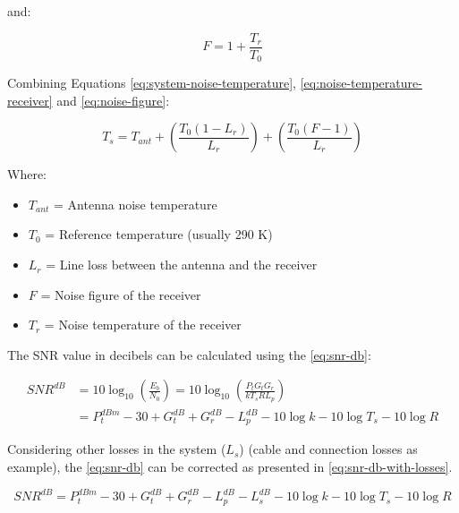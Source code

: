 and:

\begin{equation} \label{eq:noise-figure}
    F = 1 + \frac{T_{r}}{T_{0}}
\end{equation}

Combining Equations \ref{eq:system-noise-temperature}, \ref{eq:noise-temperature-receiver} and \ref{eq:noise-figure}:

\begin{equation} \label{eq:system-noise-temp-expanded}
    T_{s} = T_{ant} + \left( \frac{T_{0}(1 - L_{r})}{L_{r}} \right) + \left( \frac{T_{0} (F - 1)}{L_{r}} \right)
\end{equation}

Where:

\begin{itemize}
    \item $T_{ant}$ = Antenna noise temperature
    \item $T_{0}$ = Reference temperature (usually 290 K)
    \item $L_{r}$ = Line loss between the antenna and the receiver
    \item $F$ = Noise figure of the receiver
    \item $T_{r}$ = Noise temperature of the receiver
\end{itemize}

The SNR value in decibels can be calculated using the \autoref{eq:snr-db}:

\begin{equation} \label{eq:snr-db}
    \begin{split}
        SNR^{dB} & = 10\log_{10}\left( \frac{E_{b}}{N_{0}} \right) = 10\log_{10} \left( \frac{P_{t}G_{t}G_{r}}{kT_{s}RL_{p}} \right) \\
                 & = P_{t}^{dBm} - 30 + G_{t}^{dB} + G_{r}^{dB} - L_{p}^{dB} - 10\log k - 10\log T_{s} - 10\log R
    \end{split}
\end{equation}

Considering other losses in the system ($L_{s}$) (cable and connection losses as example), the \autoref{eq:snr-db} can be corrected as presented in \autoref{eq:snr-db-with-losses}.

\begin{equation} \label{eq:snr-db-with-losses}
    SNR^{dB} = P_{t}^{dBm} - 30 + G_{t}^{dB} + G_{r}^{dB} - L_{p}^{dB} - L_{s}^{dB} - 10\log k - 10\log T_{s} - 10\log R
\end{equation}

